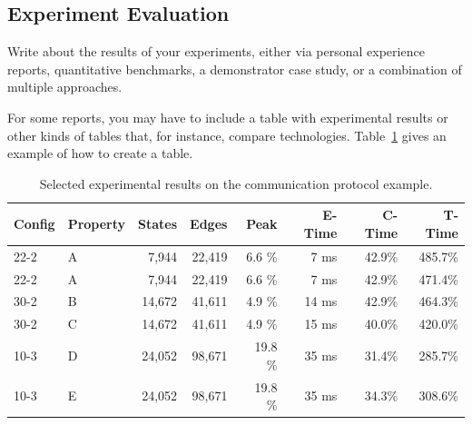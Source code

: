 \subsection{Experiment Evaluation}

Write about the results of your experiments, either via personal experience reports, quantitative benchmarks, a demonstrator case study, or a combination of multiple approaches.

For some reports, you may have to include a table with experimental
results or other kinds of tables that, for instance, compare
technologies. Table~\ref{tab:results} gives an example of how to create a table.

\begin{table}[bth]
	\centering
	\begin{tabular}{llrrrrrr}
		Config & Property & States & Edges & Peak & E-Time & C-Time & T-Time
		\\ \hline \hline
		22-2 & A   &    7,944  &   22,419  &  6.6  \%  &  7 ms & 42.9\% &  485.7\% \\
		22-2 & A   &    7,944  &   22,419  &  6.6  \%  &  7 ms & 42.9\% &  471.4\% \\
		30-2 & B   &   14,672  &   41,611  &  4.9  \%  & 14 ms & 42.9\% &  464.3\% \\
		30-2 & C   &   14,672  &   41,611  &  4.9  \%  & 15 ms & 40.0\% &  420.0\% \\ \hline
		10-3 & D   &   24,052  &   98,671  & 19.8  \%  & 35 ms & 31.4\% &  285.7\% \\
		10-3 & E   &   24,052  &   98,671  & 19.8  \%  & 35 ms & 34.3\% &  308.6\% \\
		\hline \hline
	\end{tabular}
	\caption{Selected experimental results on the communication protocol example.}
	\label{tab:results}
\end{table}
